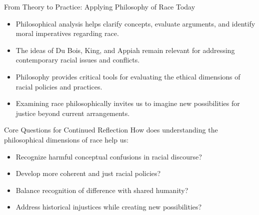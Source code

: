 \documentclass{beamer}
\begin{document}
	\begin{frame}{From Theory to Practice: Applying Philosophy of Race Today}
		\begin{itemize}
			\item Philosophical analysis helps clarify concepts, evaluate arguments, and identify moral imperatives regarding race.
			\item The ideas of Du Bois, King, and Appiah remain relevant for addressing contemporary racial issues and conflicts.
			\item Philosophy provides critical tools for evaluating the ethical dimensions of racial policies and practices.
			\item Examining race philosophically invites us to imagine new possibilities for justice beyond current arrangements.
		\end{itemize}
		
		\begin{alertblock}{Core Questions for Continued Reflection}
			\scriptsize
			How does understanding the philosophical dimensions of race help us:
			\begin{itemize}
				\item Recognize harmful conceptual confusions in racial discourse?
				\item Develop more coherent and just racial policies?
				\item Balance recognition of difference with shared humanity?
				\item Address historical injustices while creating new possibilities?
			\end{itemize}
		\end{alertblock}
	\end{frame}
	
\end{document}
